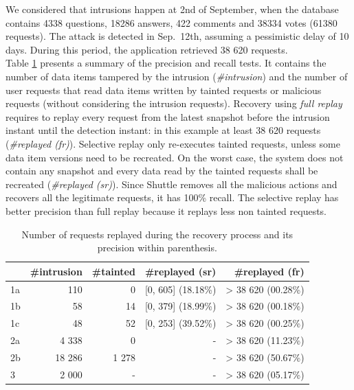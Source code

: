 We considered that intrusions happen at 2nd of September, when the database contains 4338 questions, 18286 answers, 422 comments and 38334 votes (61380 requests). The attack is detected in Sep.~12th, assuming a pessimistic delay of 10 days. During this period, the application retrieved 38 620 requests.\\

Table \ref{tab:accuracy} presents a summary of the precision and recall tests. It contains the number of data items tampered by the intrusion (\emph{\#intrusion}) and the number of user requests that read data items written by  tainted requests or malicious requests (without considering the intrusion requests). Recovery using \textit{full replay} requires to replay every request from the latest snapshot before the intrusion instant until the detection instant: in this example at least 38 620 requests (\emph{\#replayed (fr)}). Selective replay only re-executes tainted requests, unless some data item versions need to be recreated. On the worst case, the system does not contain any snapshot and every data read by the tainted requests shall be recreated (\emph{\#replayed (sr)}). Since Shuttle removes all the malicious actions and recovers all the legitimate requests, it has 100\% recall. The selective replay has better precision than full replay because it replays less non tainted requests.

\begin{table}
\centering
\begin{tabular}{l|rrrr}
    & \textbf{\#intrusion} & \textbf{\#tainted} & \textbf{\#replayed (sr)}  & \textbf{\#replayed (fr)}   \\ \hline
1a       & 110          & 0          & [0, 605] (18.18\%)   & > 38 620 (00.28\%)  \\
1b       & 58           & 14         & [0, 379] (18.99\%)   & > 38 620 (00.18\%)  \\
1c       & 48           & 52         & [0, 253] (39.52\%)   & > 38 620 (00.25\%)  \\
2a       & 4 338        & 0          &  -                   & > 38 620 (11.23\%)  \\
2b       & 18 286       & 1 278      &  -                   & > 38 620 (50.67\%)  \\
3        & 2 000        & -          &  -                   & > 38 620 (05.17\%)  \\
\end{tabular}
  \caption{Number of requests replayed during the recovery process and its precision within parenthesis.}
  \label{tab:accuracy}
  \vspace{-5mm}
\end{table}


